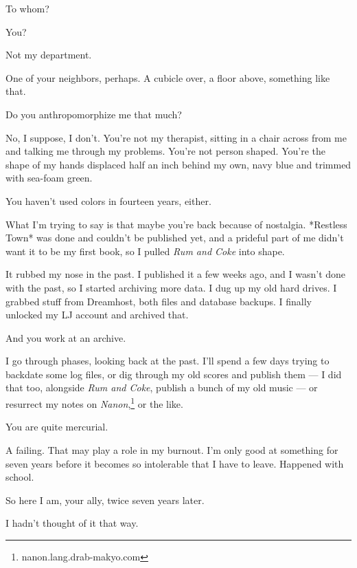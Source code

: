 \begin{paracol}{2}
\begin{leftcolumn}
\begin{ally}
To whom?
\end{ally}
You?

\begin{ally}
Not my department.
\end{ally}
One of your neighbors, perhaps. A cubicle over, a floor above, something like that.

\begin{ally}
Do you anthropomorphize me that much?
\end{ally}
No, I suppose, I don't. You're not my therapist, sitting in a chair across from me and talking me through my problems. You're not person shaped. You're the shape of my hands displaced half an inch behind my own, navy blue and trimmed with sea-foam green.

\begin{ally}
You haven't used colors in fourteen years, either.
\end{ally}
What I'm trying to say is that maybe you're back because of nostalgia. *Restless Town* was done and couldn't be published yet, and a prideful part of me didn't want it to be my first book, so I pulled \emph{Rum and Coke} into shape.

It rubbed my nose in the past. I published it a few weeks ago, and I wasn't done with the past, so I started archiving more data. I dug up my old hard drives. I grabbed stuff from Dreamhost, both files and database backups. I finally unlocked my LJ account and archived that.

\begin{ally}
And you work at an archive.
\end{ally}
I go through phases, looking back at the past. I'll spend a few days trying to backdate some log files, or dig through my old scores and publish them --- I did that too, alongside \emph{Rum and Coke}, publish a bunch of my old music --- or resurrect my notes on \emph{Nanon},\footnote{nanon.lang.drab-makyo.com} or the like.

\begin{ally}
You are quite mercurial.
\end{ally}
A failing. That may play a role in my burnout. I'm only good at something for seven years before it becomes so intolerable that I have to leave. Happened with school.

\begin{ally}
So here I am, your ally, twice seven years later.
\end{ally}
I hadn't thought of it that way.


\end{leftcolumn}
\end{paracol}
